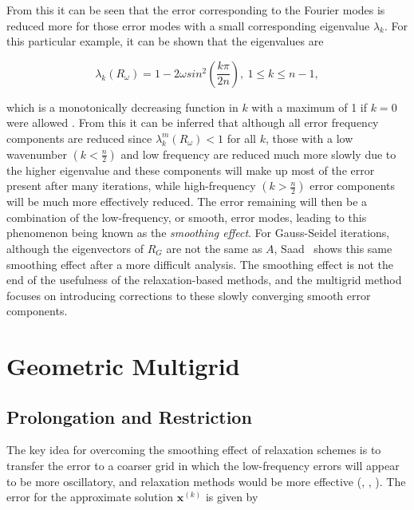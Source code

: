 From this it can be seen that the error corresponding to the Fourier modes is reduced more for those error modes with a small corresponding eigenvalue $\lambda_k$. For this particular example, it can be shown that the eigenvalues are

\begin{equation}
	\lambda_k(R_{\omega}) = 1 - 2\omega sin^2\left(\frac{k\pi}{2n}\right),\ 1 \leq k \leq n-1,
\end{equation}

which is a monotonically decreasing function in $k$ with a maximum of 1 if $k = 0$ were allowed \cite{Briggs2000}. From this it can be inferred that although all error frequency components are reduced since $\lambda_k^m(R_{\omega}) < 1$ for all $k$, those with a low wavenumber $\left(k < \frac{n}{2}\right)$ and low frequency are reduced much more slowly due to the higher eigenvalue and these components will make up most of the error present after many iterations, while high-frequency $\left(k > \frac{n}{2}\right)$ error components will be much more effectively reduced. The error remaining will then be a combination of the low-frequency, or smooth, error modes, leading to this phenomenon being known as the \emph{smoothing effect}. For Gauss-Seidel iterations, although the eigenvectors of $R_G$ are not the same as $A$, Saad~\cite{Saad2003} shows this same smoothing effect after a more difficult analysis. The smoothing effect is not the end of the usefulness of the relaxation-based methods, and the multigrid method focuses on introducing corrections to these slowly converging smooth error components.


\section{Geometric Multigrid}


\subsection{Prolongation and Restriction}

The key idea for overcoming the smoothing effect of relaxation schemes is to transfer the error to a coarser grid in which the low-frequency errors will appear to be more oscillatory, and relaxation methods would be more effective (\cite{Briggs2000}, \cite{Ruge1987}, \cite{Saad2003}). The error for the approximate solution $\mathbf{x}^{(k)}$ is given by

